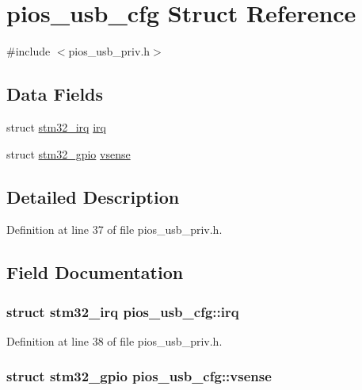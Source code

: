 \hypertarget{structpios__usb__cfg}{\section{pios\-\_\-usb\-\_\-cfg Struct Reference}
\label{structpios__usb__cfg}
}


{\ttfamily \#include $<$pios\-\_\-usb\-\_\-priv.\-h$>$}

\subsection*{Data Fields}
\begin{DoxyCompactItemize}
\item 
struct \hyperlink{structstm32__irq}{stm32\-\_\-irq} \hyperlink{structpios__usb__cfg_acf35c94952c92310b680586289e5b5b0}{irq}
\item 
struct \hyperlink{structstm32__gpio}{stm32\-\_\-gpio} \hyperlink{structpios__usb__cfg_a5a77bb8822ce4859959d3692f3ca165a}{vsense}
\end{DoxyCompactItemize}


\subsection{Detailed Description}


Definition at line 37 of file pios\-\_\-usb\-\_\-priv.\-h.



\subsection{Field Documentation}
\hypertarget{structpios__usb__cfg_acf35c94952c92310b680586289e5b5b0}{
\subsubsection[{irq}]{\setlength{\rightskip}{0pt plus 5cm}struct {\bf stm32\-\_\-irq} pios\-\_\-usb\-\_\-cfg\-::irq}}\label{structpios__usb__cfg_acf35c94952c92310b680586289e5b5b0}


Definition at line 38 of file pios\-\_\-usb\-\_\-priv.\-h.

\hypertarget{structpios__usb__cfg_a5a77bb8822ce4859959d3692f3ca165a}{
\subsubsection[{vsense}]{\setlength{\rightskip}{0pt plus 5cm}struct {\bf stm32\-\_\-gpio} pios\-\_\-usb\-\_\-cfg\-::vsense}}\label{structpios__usb__cfg_a5a77bb8822ce4859959d3692f3ca165a}


